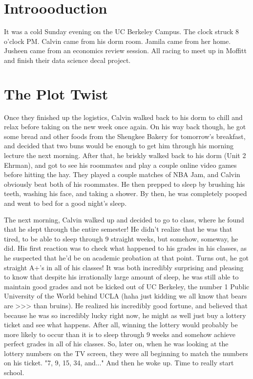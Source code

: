 \documentclass{article}
\begin{document}
\section{Introooduction}

It was a cold Sunday evening on the UC Berkeley Campus. The clock struck 8
o'clock PM. Calvin came from his dorm room. Jamila came from her home.
Jusheen came from an economics review session. All racing to meet up in Moffitt
and finish their data science decal project.

\section{The Plot Twist}

Once they finished up the logistics, Calvin walked back to his dorm to chill and
relax before taking on the new week once again. On his way back though, he got
some bread and other foods from the Shengkee Bakery for tomorrow's breakfast, and
decided that two buns would be enough to get him through his morning lecture the
next morning. After that, he briskly walked back to his dorm (Unit 2 Ehrman), and
got to see his roommates and play a couple online video games before hitting the hay.
They played a couple matches of NBA Jam, and Calvin obviously beat both of his
roommates. He then prepped to sleep by brushing his teeth, washing his face, and
taking a shower. By then, he was completely pooped and went to bed for a good
night's sleep.

The next morning, Calvin walked up and decided to go to class, where he found
that he slept through the entire semester! He didn't realize that he was that tired,
to be able to sleep through 9 straight weeks, but somehow, someway, he did. His
first reaction was to check what happened to his grades in his classes, as he suspected
that he'd be on academic probation at that point. Turns out, he got straight A+'s in
all of his classes! It was both incredibly surprising and pleasing to know that
despite his irrationally large amount of sleep, he was still able to maintain good
grades and not be kicked out of UC Berkeley, the number 1 Public University of the World
behind UCLA (haha just kidding we all know that bears are >>> than bruins). He
realized his incredibly good fortune, and believed that because he was so incredibly
lucky right now, he might as well just buy a lottery ticket and see what happens.
After all, winning the lottery would probably be more likely to occur than it is to
sleep through 9 weeks and somehow achieve perfect grades in all of his classes.
So, later on, when he was looking at the lottery numbers on the TV screen, they were
all beginning to match the numbers on his ticket. "7, 9, 15, 34, and..." And then
he woke up. Time to really start school.
\end{document}
